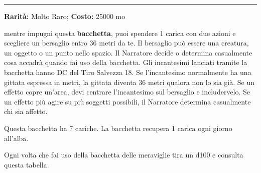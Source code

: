 \begin{multicols}{2}
\smallskip\noindent\rule{\linewidth}{2pt}  \hypertarget{BacchettadelleMeraviglie}{}\smallskip{}\noindent\label{BacchettadelleMeraviglie}

\textbf{Rarità:} Molto Raro; \textbf{Costo:} 25000 mo

mentre impugni questa \textbf{bacchetta}, puoi spendere 1 carica con due azioni e scegliere un bersaglio entro 36 metri da te. Il bersaglio può essere una creatura, un oggetto o un punto nello spazio. Il Narratore decide o determina casualmente cosa accadrà quando fai uso della bacchetta. Gli incantesimi lanciati tramite la bacchetta hanno DC del Tiro Salvezza 18. Se l'incantesimo normalmente ha una gittata espressa in metri, la gittata diventa 36 metri qualora non lo sia già. Se un effetto copre un'area, devi centrare l'incantesimo sul bersaglio e includervelo. Se un effetto più agire su più soggetti possibili, il Narratore determina casualmente chi sia affetto.

Questa bacchetta ha 7 cariche. La bacchetta recupera 1 carica ogni giorno all'alba.

Ogni volta che fai uso della bacchetta delle meraviglie tira un d100 e consulta questa tabella.


%

\medskip


\end{multicols}
